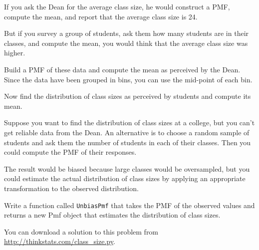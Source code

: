 \documentclass[12pt]{book}
\begin{document}
If you ask the Dean for the average class size, he would
construct a PMF, compute the mean, and report that the
average class size is 24.

But if you survey a group of students, ask them how many
students are in their classes, and compute the mean, you would
think that the average class size was higher.

\begin{exercise}
Build a PMF of these data and compute the mean as perceived by the
Dean.  Since the data have been grouped in bins, you can use the
mid-point of each bin.

Now find the distribution of class sizes as perceived by students
and compute its mean.  

Suppose you want to find the distribution of class sizes at a
college, but you can't get reliable data from the Dean.
An alternative is to choose a random sample of students and ask them
the number of students in each of their classes.  Then you could compute
the PMF of their responses.

The result would be biased because large classes
would be oversampled, but you could estimate the actual
distribution of class sizes by applying an appropriate transformation
to the observed distribution.

Write a function called \verb"UnbiasPmf" that takes the PMF of the
observed values and returns a new Pmf object that estimates the
distribution of class sizes.

You can download a solution to this problem from
\url{http://thinkstats.com/class_size.py}.

\end{exercise}
\end{document}
